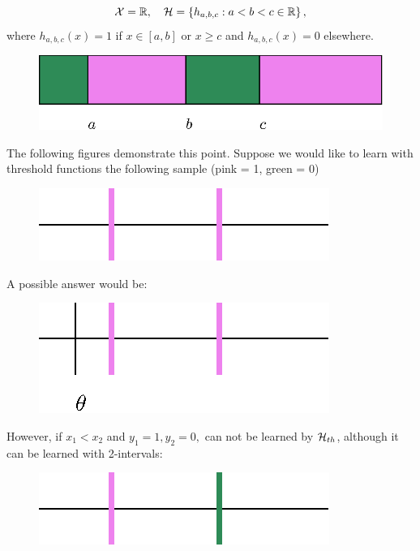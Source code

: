{\[\mathcal{X} = \mathbb{R} , \quad \mathcal{H} = \{ h_{a,b,c} : a < b < c \in \mathbb{R} \}\,,\]
where $h_{a,b,c}(x)=1$ if $x \in [a,b]$ or $x\geq c$ and $h_{a,b,c}(x)=0$ elsewhere.

\begin{figure}[h!]
	\centering
	\includegraphics[scale=0.8]{chapters/pac/figures/2_intervals.eps}
\end{figure}



The following figures demonstrate this point. Suppose we would like to learn with threshold functions the following sample  (pink = 1, green = 0)
\begin{figure}[h!]
	\centering
	\includegraphics[scale=0.6]{chapters/pac/figures/VC_threshold_intuitive.eps}
\end{figure}

A possible answer would be:
\begin{figure}[h!]
	\centering
	\includegraphics[scale=0.6]{chapters/pac/figures/VC_threshold_intuitive3.eps}
\end{figure}

However, if $x_1 < x_2$ and $y_1=1, y_2=0, $ can not be learned by $\mathcal{H}_{th}$, although it can be learned with 2-intervals:
\begin{figure}[h!]
	\centering
	\includegraphics[scale=0.6]{chapters/pac/figures/VC_threshold_intuitive2.eps}
\end{figure}

}
